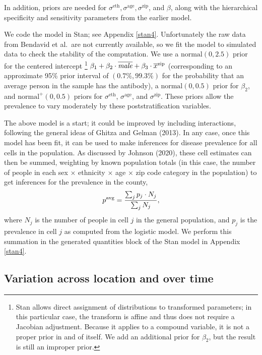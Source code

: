 \documentclass[11pt]{article}
\begin{document}
In addition, priors are needed for
$\sigma^{\textrm{eth}}, \sigma^{\textrm{age}}, \sigma^{\textrm{zip}}$,
and $\beta$, along with the hierarchical specificity and sensitivity
parameters from the earlier model.

We code the model in Stan; see Appendix \ref{stan4}.  Unfortunately
the raw data from Bendavid et al.\ are not currently available, so we
fit the model to simulated data to check the stability of the
computation.  We use a $\mbox{normal}(0,2.5)$ prior for the centered
intercept%
%
\footnote{Stan allows direct assignment of distributions to
  transformed parameters; in this particular case, the transform is
  affine and thus does not require a Jacobian adjustment.  Because it
  applies to a compound variable, it is not a proper prior in and of
  itself.  We add an additional prior for $\beta_2$, but the result is
  still an improper prior.}
%  
$\beta_1 + \beta_2 \cdot \overline{\it male} + \beta_3 \cdot \overline{x}^{\rm zip}$
(corresponding to an approximate 95\% prior interval of
$(0.7\%, 99.3\%)$ for the probability that an average person in the
sample has the antibody), a $\mbox{normal}(0,0.5)$ prior for
$\beta_2$, and $\mbox{normal}^+(0, 0.5)$ priors for
$\sigma^{\textrm{eth}}$, $\sigma^{\textrm{age}}$, and
$\sigma^{\textrm{zip}}$.  These priors allow the prevalence to vary
moderately by these poststratification variables.

The above model is a start; it could be improved by including
interactions, following the general ideas of Ghitza and Gelman (2013).
In any case, once this model has been fit, it can be used to make
inferences for disease prevalence for all cells in the population. As
discussed by Johnson (2020), these cell estimates can then be summed,
weighting by known population totals (in this case, the number of
people in each sex $\times$ ethnicity $\times$ age $\times$ zip code
category in the population) to get inferences for the prevalence in
the county,
%
\begin{equation*}
  p^{\textrm{avg}}
  = \frac{\small\textstyle \sum_j p_j \cdot N_j}
         {\small\textstyle \sum_j N_j},
\end{equation*}
%
where $N_j$ is the
number of people in cell $j$ in the general population, and $p_j$ is
the prevalence in cell $j$ as computed from the logistic model.  We
perform this summation in the generated quantities block of the Stan
model in Appendix \ref{stan4}.

\subsection{Variation across location and over time}\label{muiltiple}
\end{document}
